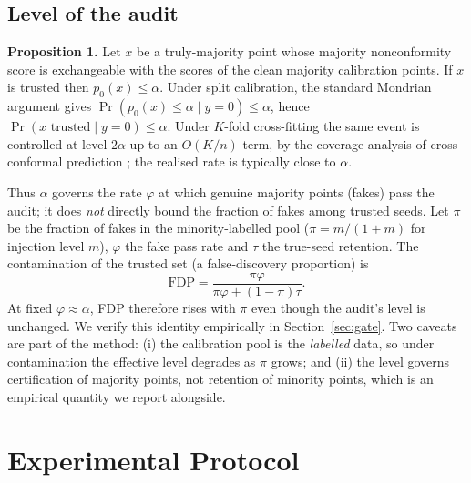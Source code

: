 \documentclass[10pt]{article} %
\begin{document}
\subsection{Level of the audit}
\label{sec:level}

\textbf{Proposition 1.} Let $x$ be a truly-majority point whose majority nonconformity score is exchangeable with the scores of the clean majority calibration points. If $x$ is trusted then $p_0(x) \le \alpha$. Under split calibration, the standard Mondrian argument gives $\Pr(p_0(x) \le \alpha \mid y=0) \le \alpha$, hence $\Pr(x \text{ trusted} \mid y=0) \le \alpha$. Under $K$-fold cross-fitting the same event is controlled at level $2\alpha$ up to an $O(K/n)$ term, by the coverage analysis of cross-conformal prediction \citep{vovk2015cross, barber2021predictive}; the realised rate is typically close to $\alpha$.

Thus $\alpha$ governs the rate $\varphi$ at which genuine majority points (fakes) pass the audit; it does \emph{not} directly bound the fraction of fakes among trusted seeds. Let $\pi$ be the fraction of fakes in the minority-labelled pool ($\pi = m/(1+m)$ for injection level $m$), $\varphi$ the fake pass rate and $\tau$ the true-seed retention. The contamination of the trusted set (a false-discovery proportion) is
\begin{equation}
\mathrm{FDP} = \frac{\pi \varphi}{\pi \varphi + (1-\pi)\tau}.
\label{eq:fdp}
\end{equation}
At fixed $\varphi \approx \alpha$, FDP therefore rises with $\pi$ even though the audit's level is unchanged. We verify this identity empirically in Section~\ref{sec:gate}. Two caveats are part of the method: (i) the calibration pool is the \emph{labelled} data, so under contamination the effective level degrades as $\pi$ grows; and (ii) the level governs certification of majority points, not retention of minority points, which is an empirical quantity we report alongside.

\section{Experimental Protocol}
\end{document}
